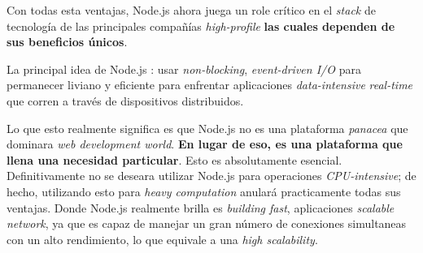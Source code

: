 Con todas esta ventajas, Node.js ahora juega un role crítico en el \textit{stack} de tecnología de las principales compañías \textit{high-profile}\cite{online_nodejs_highprofilecompanies} \textbf{las cuales dependen de sus beneficios únicos}.



La principal idea de Node.js : usar \textit{non-blocking}, \textit{event-driven I/O} para permanecer liviano y eficiente para enfrentar aplicaciones \textit{data-intensive} \textit{real-time} que corren a través de dispositivos distribuidos.


Lo que esto realmente significa es que Node.js no es una plataforma \textit{panacea} que dominara \textit{web development world}. \textbf{En lugar de eso, es una plataforma que llena una necesidad particular}. Esto es absolutamente esencial. Definitivamente no se deseara utilizar Node.js para operaciones \textit{CPU-intensive}; de hecho, utilizando esto para \textit{heavy computation} anulará practicamente todas sus ventajas. Donde Node.js realmente brilla es \textit{building fast}, aplicaciones \textit{scalable network}, ya que es capaz de manejar un gran número de conexiones simultaneas con un alto rendimiento, lo que equivale a una \textit{high scalability}.

